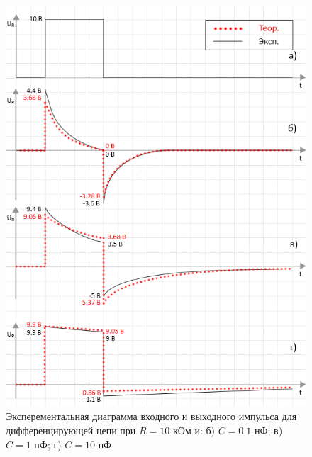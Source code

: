 \begin{figure}[H]
	\begin{center}
		\includegraphics[width=14cm]{img/diff_with_theory}
		\caption{Эксперементальная диаграмма входного и выходного импульса для дифференцирующей цепи при $R = 10$ кОм и: б) $C = 0.1$ нФ; в) $C = 1$ нФ; г) $C = 10$ нФ.} 
		\label{d:1} %
	\end{center}
\end{figure}

